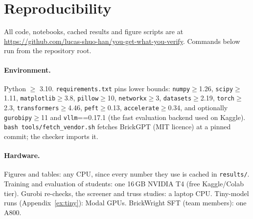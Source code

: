 \section{Reproducibility}
\label{app:repro}

All code, notebooks, cached results and figure scripts are at \url{https://github.com/lucas-shuo-han/you-get-what-you-verify}. Commands below run from the repository root.

\paragraph{Environment.} Python $\geq$ 3.10. \texttt{requirements.txt} pins lower bounds: \texttt{numpy}$\geq$1.26, \texttt{scipy}$\geq$1.11, \texttt{matplotlib}$\geq$3.8, \texttt{pillow}$\geq$10, \texttt{networkx}$\geq$3, \texttt{datasets}$\geq$2.19, \texttt{torch}$\geq$2.3, \texttt{transformers}$\geq$4.46, \texttt{peft}$\geq$0.13, \texttt{accelerate}$\geq$0.34, and optionally \texttt{gurobipy}$\geq$11 and \texttt{vllm}==0.17.1 (the fast evaluation backend used on Kaggle). \texttt{bash tools/fetch\_vendor.sh} fetches BrickGPT (MIT licence) at a pinned commit; the checker imports it.

\paragraph{Hardware.} Figures and tables: any CPU, since every number they use is cached in \texttt{results/}. Training and evaluation of students: one 16\,GB NVIDIA T4 (free Kaggle/Colab tier). Gurobi re-checks, the screener and truss studies: a laptop CPU. Tiny-model runs (Appendix~\ref{ex:tiny}): Modal GPUs. BrickWright SFT (team members): one A800.

